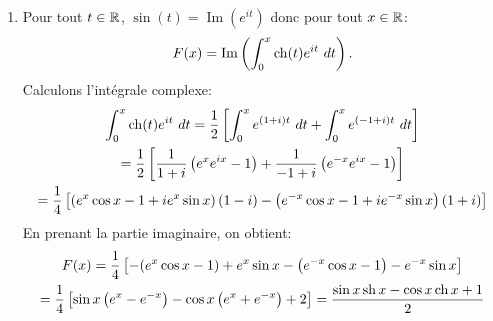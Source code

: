 \begin{enumerate}
\begin{enumerate}
\item Pour tout $t\in \mathbb{R}$, $\sin (t) = \operatorname{Im}(e^{it})$ donc pour tout $x\in \mathbb{R}$:
$$F(x) = \operatorname{Im}\left ( \int_{0}^{x}\operatorname{ch} (t)e^{it}\ dt \right ).$$
Calculons l'intégrale complexe:
\begin{multline*}
 \int_{0}^{x}\operatorname{ch} (t)e^{it}\ dt  = \frac{1}{2}\left [ \int_{0}^{x}e^{(1+i)t} \ dt + \int_{0}^{x}e^{(-1+i)t}\ dt \right ] \\
  = \frac{1}{2} \left [ \frac{1}{1+i}\left ( e^{x}e^{ix}-1\right ) + \frac{1}{-1+i}\left ( e^{-x}e^{ix} - 1 \right ) \right ] \\
  = \frac{1}{4} \left[ \left(e^{x}\cos x - 1  + ie^{x}\sin x\right) (1-i) - \left( e^{-x}\cos x - 1 + ie^{-x}\sin x \right)(1+i) \right]
\end{multline*}
En prenant la partie imaginaire, on obtient:
\begin{multline*}
 F(x)  = \frac{1}{4} \left [ -(e^{x}\cos x-1)+e^{x}\sin x - \left ( e^{-x}\cos x - 1\right )-e^{-x}\sin x \right] \\
  = \frac{1}{4}\left[ \sin x\left( e^{x}-e^{-x} \right) -\cos x\left( e^{x}+e^{-x} \right) + 2\right]
  = \frac{\sin x\operatorname{sh} x - \cos x\operatorname{ch} x + 1}{2}
\end{multline*}
\end{enumerate}


\end{enumerate}
